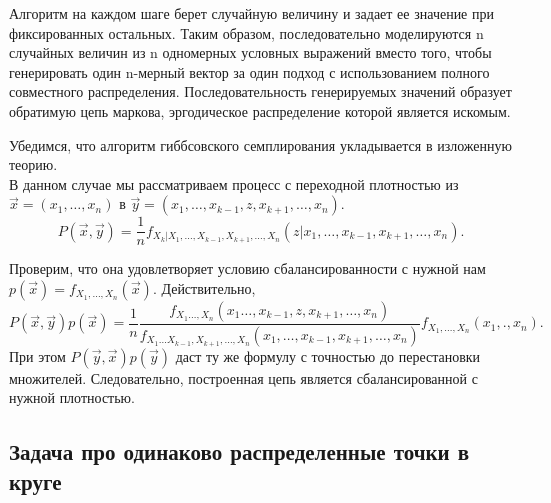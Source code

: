 \documentclass[14pt,a4paper]{article}
\begin{document}
Алгоритм на каждом шаге берет случайную величину и задает ее значение при фиксированных остальных.  
Таким образом, последовательно моделируются n случайных величин из n одномерных условных выражений вместо того, чтобы генерировать один n-мерный вектор за один подход с использованием полного совместного распределения. Последовательность генерируемых значений образует обратимую цепь маркова, эргодическое распределение которой является искомым.
\[\]

Убедимся, что алгоритм гиббсовского семплирования укладывается в изложенную \\теорию.\\
В данном случае мы рассматриваем процесс с переходной плотностью из $\vec{x} = (x_1,\dots,x_n)$ в $\vec{y} = (x_1,\dots,x_{k-1},z,x_{k+1},\dots,x_n)$.
\begin{equation}
    P(\vec{x}, \vec{y})=\frac{1}{n} f_{X_{k} | X_{1}, \ldots, X_{k-1}, X_{k+1}, \ldots, X_{n}}\left(z | x_{1}, \ldots, x_{k-1}, x_{k+1}, \ldots, x_{n}\right).
\end{equation}

Проверим, что она удовлетворяет условию сбалансированности с нужной нам $p(\vec{x}) = f_{X_1,\dots, X_n}(\vec{x})$.
Действительно,
\begin{equation}
    P(\vec{x}, \vec{y}) p(\vec{x})=\frac{1}{n} \frac{f_{X_{1} \ldots, X_{n}}\left(x_{1} \ldots, x_{k-1}, z, x_{k+1}, \ldots, x_{n}\right)}{f_{X_{1} \ldots X_{k-1}, X_{k+1}, \ldots, X_{n}}\left(x_{1}, \ldots, x_{k-1}, x_{k+1}, \ldots, x_{n}\right)} f_{X_{1}, \dots, X_{n}}\left(x_{1},., x_{n}\right).
\end{equation}
При этом $P(\vec{y}, \vec{x}) p(\vec{y})$ даст ту же формулу с точностью до перестановки множителей.
Следовательно, построенная цепь является сбалансированной с нужной плотностью.

\newpage
\subsection{Задача про одинаково распределенные точки в круге}
\end{document}
